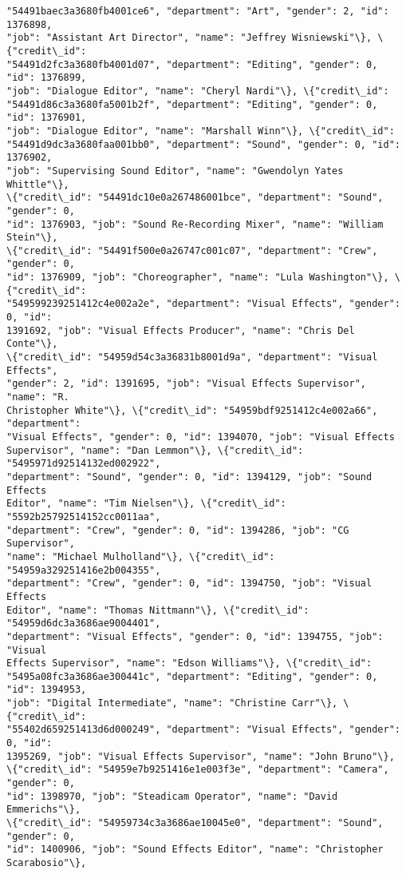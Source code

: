 \documentclass[11pt]{article}
\begin{document}
\begin{tcolorbox}[breakable, size=fbox, boxrule=.5pt, pad at break*=1mm, opacityfill=0]
\begin{Verbatim}[commandchars=\\\{\}]
"54491baec3a3680fb4001ce6", "department": "Art", "gender": 2, "id": 1376898,
"job": "Assistant Art Director", "name": "Jeffrey Wisniewski"\}, \{"credit\_id":
"54491d2fc3a3680fb4001d07", "department": "Editing", "gender": 0, "id": 1376899,
"job": "Dialogue Editor", "name": "Cheryl Nardi"\}, \{"credit\_id":
"54491d86c3a3680fa5001b2f", "department": "Editing", "gender": 0, "id": 1376901,
"job": "Dialogue Editor", "name": "Marshall Winn"\}, \{"credit\_id":
"54491d9dc3a3680faa001bb0", "department": "Sound", "gender": 0, "id": 1376902,
"job": "Supervising Sound Editor", "name": "Gwendolyn Yates Whittle"\},
\{"credit\_id": "54491dc10e0a267486001bce", "department": "Sound", "gender": 0,
"id": 1376903, "job": "Sound Re-Recording Mixer", "name": "William Stein"\},
\{"credit\_id": "54491f500e0a26747c001c07", "department": "Crew", "gender": 0,
"id": 1376909, "job": "Choreographer", "name": "Lula Washington"\}, \{"credit\_id":
"549599239251412c4e002a2e", "department": "Visual Effects", "gender": 0, "id":
1391692, "job": "Visual Effects Producer", "name": "Chris Del Conte"\},
\{"credit\_id": "54959d54c3a36831b8001d9a", "department": "Visual Effects",
"gender": 2, "id": 1391695, "job": "Visual Effects Supervisor", "name": "R.
Christopher White"\}, \{"credit\_id": "54959bdf9251412c4e002a66", "department":
"Visual Effects", "gender": 0, "id": 1394070, "job": "Visual Effects
Supervisor", "name": "Dan Lemmon"\}, \{"credit\_id": "5495971d92514132ed002922",
"department": "Sound", "gender": 0, "id": 1394129, "job": "Sound Effects
Editor", "name": "Tim Nielsen"\}, \{"credit\_id": "5592b25792514152cc0011aa",
"department": "Crew", "gender": 0, "id": 1394286, "job": "CG Supervisor",
"name": "Michael Mulholland"\}, \{"credit\_id": "54959a329251416e2b004355",
"department": "Crew", "gender": 0, "id": 1394750, "job": "Visual Effects
Editor", "name": "Thomas Nittmann"\}, \{"credit\_id": "54959d6dc3a3686ae9004401",
"department": "Visual Effects", "gender": 0, "id": 1394755, "job": "Visual
Effects Supervisor", "name": "Edson Williams"\}, \{"credit\_id":
"5495a08fc3a3686ae300441c", "department": "Editing", "gender": 0, "id": 1394953,
"job": "Digital Intermediate", "name": "Christine Carr"\}, \{"credit\_id":
"55402d659251413d6d000249", "department": "Visual Effects", "gender": 0, "id":
1395269, "job": "Visual Effects Supervisor", "name": "John Bruno"\},
\{"credit\_id": "54959e7b9251416e1e003f3e", "department": "Camera", "gender": 0,
"id": 1398970, "job": "Steadicam Operator", "name": "David Emmerichs"\},
\{"credit\_id": "54959734c3a3686ae10045e0", "department": "Sound", "gender": 0,
"id": 1400906, "job": "Sound Effects Editor", "name": "Christopher Scarabosio"\},

\end{Verbatim}
\end{tcolorbox}
\end{document}
